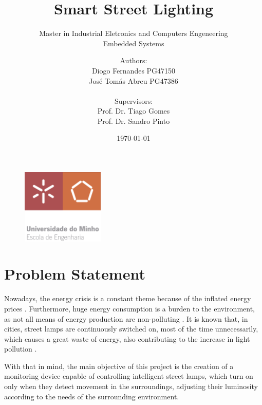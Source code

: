 \documentclass[12pt, letterpaper]{article}
\title{\textbf{Smart Street Lighting}}
\subtitle{{\large Master in Industrial Eletronics and Computers Engeneering} \\ {\large Embedded Systems}}
\author{Authors:\\Diogo Fernandes PG47150\\José Tomás Abreu PG47386\\ \\ Supervisors:\\Prof. Dr. Tiago Gomes\\Prof. Dr. Sandro Pinto}
\date{\today}
\begin{document}
{\begin{figure}[t]
	\centering
	\includegraphics[width=0.35\textwidth]{EEUMLOGO}
\end{figure}}

\maketitle

\clearpage
\section{Problem Statement}
Nowadays, the energy crisis is a constant theme because of the inflated energy prices \cite{energy_crisis}. Furthermore, huge energy consumption is a burden to the environment, as not all means of energy production are non-polluting \cite{energy_supply}. It is known that, in cities, street lamps are continuously switched on, most of the time unnecessarily, which causes a great waste of energy, also contributing to the increase in light pollution \cite{light_pollution}.
	
With that in mind, the main objective of this project is the creation of a monitoring device capable of controlling intelligent street lamps, which turn on only when they detect movement in the surroundings, adjusting their luminosity according to the needs of the surrounding environment.



\end{document}
